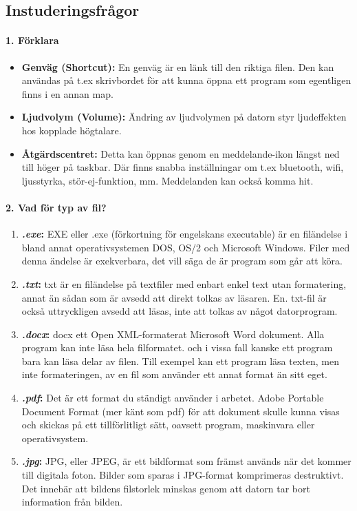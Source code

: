 \newpage
\subsection{Instuderingsfrågor}

\paragraph{1. Förklara}
\begin{itemize}
	\item \textbf{Genväg (Shortcut):} En genväg är en länk till den riktiga filen. Den kan användas på t.ex skrivbordet för att kunna öppna ett program som egentligen finns i en annan map.
	\item \textbf{Ljudvolym (Volume):} Ändring av ljudvolymen på datorn styr ljudeffekten hos kopplade högtalare.
	\item \textbf{Åtgärdscentret:} Detta kan öppnas genom en meddelande-ikon längst ned till höger på taskbar. Där finns snabba inställningar om t.ex bluetooth, wifi, ljusstyrka, stör-ej-funktion, mm. Meddelanden kan också komma hit.
\end{itemize}

\paragraph{2. Vad för typ av fil?}
\begin{enumerate}
	\item \textbf{\textit{.exe}:} EXE eller .exe (förkortning för engelskans executable) är en filändelse i bland annat operativsystemen DOS, OS/2 och Microsoft Windows. Filer med denna ändelse är exekverbara, det vill säga de är program som går att köra.
	\item \textbf{\textit{.txt}:} txt är en filändelse på textfiler med enbart enkel text utan formatering, annat än sådan som är avsedd att direkt tolkas av läsaren. En. txt-fil är också uttryckligen avsedd att läsas, inte att tolkas av något datorprogram.
	\item \textbf{\textit{.docx}:} docx ett Open XML-formaterat Microsoft Word dokument. Alla program kan inte läsa hela filformatet. och i vissa fall kanske ett program bara kan läsa delar av filen. Till exempel kan ett program läsa texten, men inte formateringen, av en fil som använder ett annat format än sitt eget.
	\item \textbf{\textit{.pdf}:} Det är ett format du ständigt använder i arbetet. Adobe Portable Document Format (mer känt som pdf) för att dokument skulle kunna visas och skickas på ett tillförlitligt sätt, oavsett program, maskinvara eller operativsystem.
	\item \textbf{\textit{.jpg}:} JPG, eller JPEG, är ett bildformat som främst används när det kommer till digitala foton. Bilder som sparas i JPG-format komprimeras destruktivt. Det innebär att bildens filstorlek minskas genom att datorn tar bort information från bilden.
\end{enumerate}

